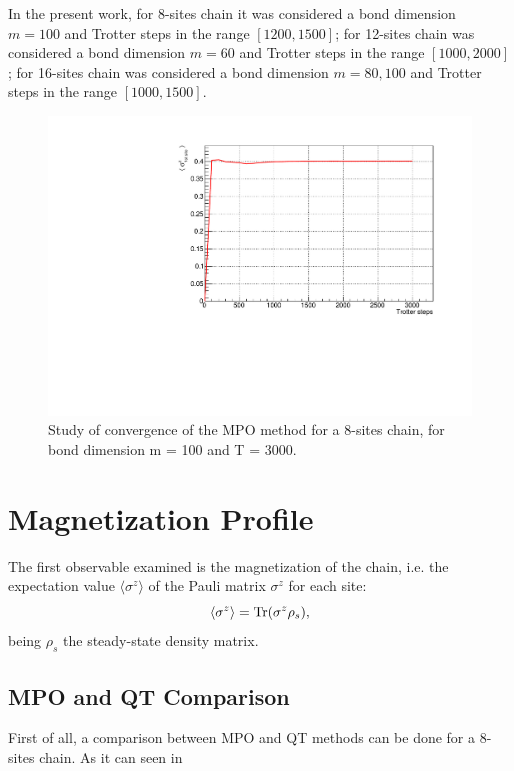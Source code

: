 In the present work, for 8-sites chain it was considered a bond dimension $m = 100$ and Trotter steps in the range $[1200, 1500]$; for 12-sites chain was considered a bond dimension $m = 60$ and Trotter steps in the range $[1000, 2000]$; for 16-sites chain was considered a bond dimension $m = 80, 100$ and Trotter steps in the range $[1000, 1500]$.

\begin{figure}[H]
    \label{fig:convergence_mpo_8sites}
    \centering
    \includegraphics[scale=0.7]{Figures/convergence/Convergence_s8T3000J1051.pdf}
    \caption{Study of convergence of the MPO method for a 8-sites chain, for bond dimension m = 100 and T = 3000.}
    \label{fig:convergenceMPO_8sites}
\end{figure}

\section{Magnetization Profile}
\label{sec:magn_profile}
The first observable examined is the magnetization of the chain, i.e. the expectation value $\langle \sigma^z \rangle$ of the Pauli matrix $\sigma^z$ for each site:
\begin{equation*}
    \langle \sigma^z \rangle = \operatorname{Tr}(\sigma^z \rho_s),
\end{equation*}
being $\rho_s$ the steady-state density matrix.

\subsection{MPO and QT Comparison}
First of all, a comparison between MPO and QT methods can be done for a 8-sites chain. As it can seen in 

